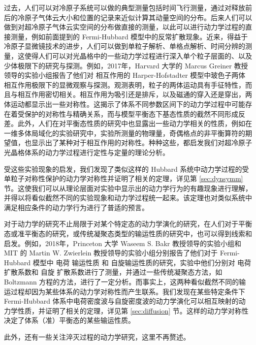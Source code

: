 过去，人们可以对冷原子系统可以做的典型测量包括时间飞行测量，通过对释放前后的冷原子气体云大小和位置的记录来近似计算其动量空间的分布。后来人们可以做到对超冷原子气体云实空间的分布做直接的测量，以此可以进行动力学过程的直接测量，例如前面提到的 Fermi-Hubbard 模型中的反常扩散现象\cite{hubbard-expan-2010,hubbard-expan-2012}。近来，得益于冷原子显微镜技术的进步，人们可以做到单粒子解析、单格点解析、时间分辨的测量，这使得人们可以对光晶格中的一些动力学过程进行深入单个粒子层面的、以及少体极限下的研究与探测。例如，2017年，Harvard 大学的 Marcus Greiner 教授领导的实验小组报告了他们对 相互作用的 Harper-Hofstadter 模型中玻色子两体相互作用极限下的显微观察与探测\cite{twobody-2017}。观测表明，粒子的两体运动具有手征特性，而且与相互作用密切相关。相互作用为吸引还是排斥，以及磁通的穿入还是穿出，两体运动都显示出一些对称性。这揭示了体系不同参数区间下的动力学过程中可能存在着受保护的对称性与精确关系，而与模型平衡态下基态性质的截然不同形成反差。此外，人们在对平衡态性质的研究中也显露出一些动力学相关的性质，例如在一维多体局域化的实验研究中\cite{mbl1d}，实验所测量的物理量，奇偶格点的非平衡算符的期望值，也显示出了某种对于相互作用的对称性。种种这些，都启发我们对超冷原子光晶格体系的动力学过程进行定性与定量的理论分析。

受这些实验现象的启发，我们发现了类似这样的 Hubbard 系统中动力学过程的受单粒子对称性保护的动力学对称性并证明了相关的定理\cite{dynsymm}，详见第 \ref{sec:dynsymm} 节。这使我们可以从理论层面对实验中显示出的动力学行为的有趣现象进行理解，并得以将看似截然不同的实验现象和动力学过程统一起来。该定理也对类似系统中满足相应条件的动力学行为进行了普适的预言。

对于动力学的研究不止局限于对某个特定态的动力学演化的研究，在人们对于平衡态或准平衡态的研究，或传统凝聚态类型的输运性质的研究中，也可以得到线索和启发。例如，2018年，Princeton 大学 Waseem S. Bakr 教授领导的实验小组和 MIT 的 Martin W. Zwierlein 教授领导的实验小组分别报告了他们对于 Fermi-Hubbard 模型中 电荷 输运性质\cite{charge-diffusion} 和 自旋输运性质\cite{spin-diffusion}的研究，实验中他们分别对 电荷 扩散系数和 自旋 扩散系数进行了测量，并通过一些传统凝聚态方法，如 Boltzmann 方程的方法，进行了一定分析。而事实上，这两种看似截然不同的输运过程却因为某些体系的动力学对称性而产生联系。我们发现在某些特定条件下 Fermi-Hubbard 体系中电荷密度波与自旋密度波的动力学演化可以相互映射的动力学性质，并证明了相关的定理\cite{diffusion}，详见第 \ref{sec:diffusion} 节。这样的动力学对称性决定了体系（准）平衡态的某些输运性质。

此外，还有一些关注淬灭过程的动力学研究，这里不再赘述。



